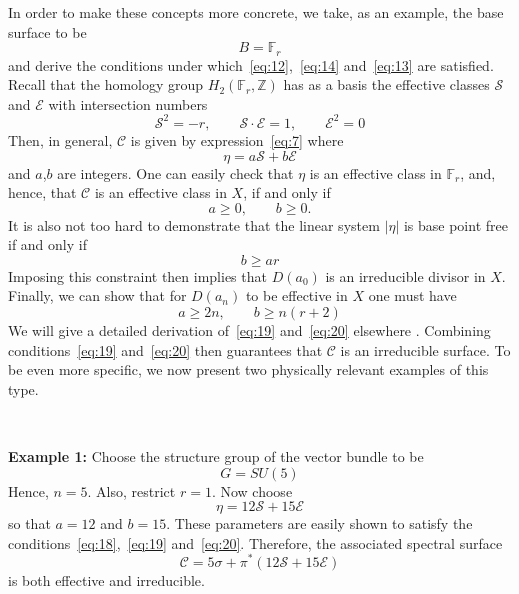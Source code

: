 \documentclass[a4paper,12pt]{article}
\numberwithin{equation}{section}
\def\cC{{\mathcal C}}
\def\cE{{\mathcal E}}
\def\cS{{\mathcal S}}
\theoremstyle{plain}
\begin{document}
In order to make these concepts more concrete, we take, as an example, the
base surface to be
\begin{equation}
B={\mathbb F}_{r}
\label{eq:15}
\end{equation}
and derive the conditions under  
which~\eqref{eq:12},~\eqref{eq:14} and~\eqref{eq:13}
are satisfied. Recall\cite{don2} that the homology group $H_{2}({\mathbb
F}_{r}, {\mathbb Z})$ has
as a basis the effective classes $\cS$ and $\cE$ with intersection numbers
\begin{equation}
\cS^{2}=-r, \qquad \cS\cdot \cE=1, \qquad \cE^{2}=0
\label{eq:16}
\end{equation}
Then, in general, $\cC$ is given by expression~\eqref{eq:7} where
\begin{equation}
\eta= a\cS+b\cE
\label{eq:17}
\end{equation}
and $a$,$b$ are integers. One can easily check that $\eta$ is an effective
class in ${\mathbb F}_{r}$, and, hence, that $\cC$ is an effective class in
$X$, if and only if
\begin{equation}
a \geq 0, \qquad b \geq 0.
\label{eq:18}
\end{equation}
It is also not too hard to demonstrate that the linear system $|\eta|$ is base
point free if and only if
\begin{equation}
b \geq ar
\label{eq:19}
\end{equation}
Imposing this constraint then implies that $D(a_{0})$ is an irreducible divisor in
$X$. Finally, we can show that for $D(a_{n})$ to be effective in $X$ one must have
\begin{equation}
a \geq 2n, \qquad b \geq n(r+2)
\label{eq:20}
\end{equation}
We will give a detailed derivation of~\eqref{eq:19} and~\eqref{eq:20} elsewhere
\cite{mathpaper}. Combining conditions~\eqref{eq:19} 
and~\eqref{eq:20} then guarantees that
$\cC$ is an irreducible surface. To be even more specific, we now present 
two physically relevant examples of this type.


\smallskip

\

\noindent
{\bf Example 1:}
Choose the structure group of the vector bundle to be
\begin{equation}
G=SU(5)
\label{eq:21}
\end{equation}
Hence, $n=5$. Also, restrict $r=1$. Now choose
\begin{equation}
\eta= 12\cS+15\cE
\label{eq:22}
\end{equation}
so that $a=12$ and $b=15$. These parameters are easily shown to satisfy
the conditions~\eqref{eq:18},~\eqref{eq:19} and~\eqref{eq:20}. Therefore,
the associated spectral surface 
\begin{equation}
\cC=5\sigma+ \pi^{*}(12\cS+15\cE)
\label{eq:23}
\end{equation}
is both effective and irreducible. 
\end{document}
